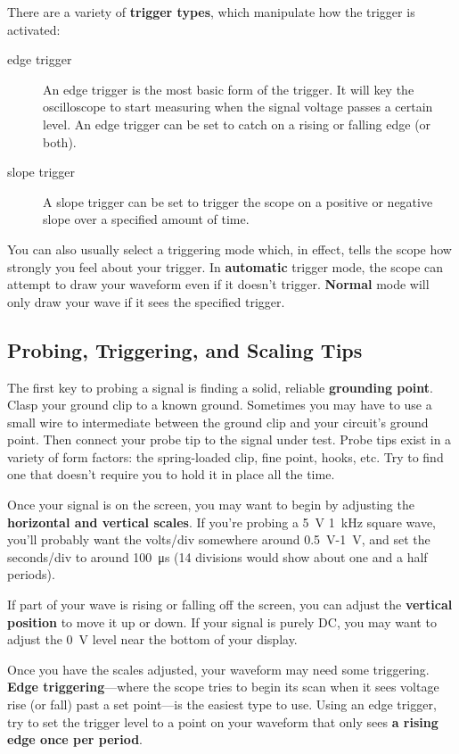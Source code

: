 \documentclass[12pt, logo=tehranDLDL/ut]{tehranDLDL}
\begin{document}
There are a variety of \textbf{trigger types}, which manipulate how the trigger is activated:
\begin{description}
    \item[edge trigger] An edge trigger is the most basic form of the trigger. It will key the oscilloscope to start measuring when the signal voltage passes a certain level. An edge trigger can be set to catch on a rising or falling edge (or both).
    \item[slope trigger] A slope trigger can be set to trigger the scope on a positive or negative slope over a specified amount of time.
\end{description}

You can also usually select a triggering mode which, in effect, tells the scope how strongly you feel about your trigger.
In \textbf{automatic} trigger mode, the scope can attempt to draw your waveform even if it doesn't trigger.
\textbf{Normal} mode will only draw your wave if it sees the specified trigger.

\subsection{Probing, Triggering, and Scaling Tips}

The first key to probing a signal is finding a solid, reliable \textbf{grounding point}. Clasp your ground clip to a known ground. Sometimes you may have to use a small wire to intermediate between the ground clip and your circuit's ground point. Then connect your probe tip to the signal under test. Probe tips exist in a variety of form factors: the spring-loaded clip, fine point, hooks, etc. Try to find one that doesn't require you to hold it in place all the time.

Once your signal is on the screen, you may want to begin by adjusting the \textbf{horizontal and vertical scales}. If you're probing a \SI{5}{\volt} \SI{1}{\kilo\hertz} square wave, you'll probably want the volts/div somewhere around \SI{0.5}{\volt}-\SI{1}{\volt}, and set the seconds/div to around \SI{100}{\micro\second} (14 divisions would show about one and a half periods).

If part of your wave is rising or falling off the screen, you can adjust the \textbf{vertical position} to move it up or down. If your signal is purely DC, you may want to adjust the \SI{0}{\volt} level near the bottom of your display.

Once you have the scales adjusted, your waveform may need some triggering. \textbf{Edge triggering}---where the scope tries to begin its scan when it sees voltage rise (or fall) past a set point---is the easiest type to use. Using an edge trigger, try to set the trigger level to a point on your waveform that only sees \textbf{a rising edge once per period}.
\end{document}
